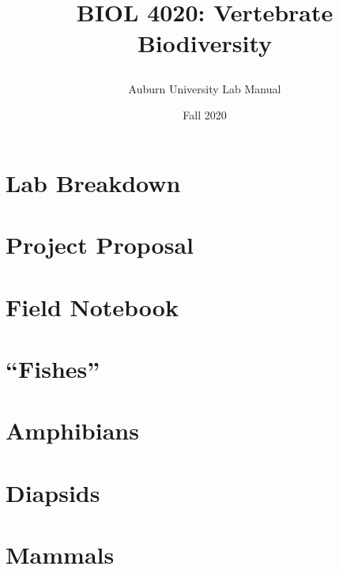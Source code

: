 \documentclass[oneside]{book}
\title{\LARGE{BIOL 4020: Vertebrate Biodiversity}
\author{\Large{Auburn University Lab Manual}
\date{\Large{Fall 2020}}
}}
\begin{document}
\maketitle
\tableofcontents
\chapter{\Huge{Lab Breakdown}} \label{SecLabBreak}
\chapter{\Huge{Project Proposal}} \label{SecProjProp}
\chapter{\Huge{Field Notebook}} \label{SecFieldNote}
\chapter{\Huge{``Fishes''}}  \label{SecFish}
\chapter{\Huge{Amphibians}} \label{SecAmphib}
\chapter{\Huge{Diapsids}} \label{SecDiapsid}
\chapter{\Huge{Mammals}} \label{SecMammal}
\end{document}
